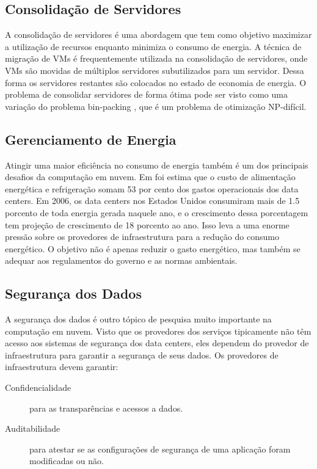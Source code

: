 	
	\subsection{Consolidação de Servidores}
	A consolidação de servidores é uma abordagem que tem como objetivo maximizar a utilização de recursos enquanto minimiza o consumo de energia. A técnica de migração de VMs é frequentemente utilizada na consolidação de servidores, onde VMs são movidas de múltiplos servidores subutilizados para um servidor. Dessa forma os servidores restantes são colocados no estado de economia de energia. O problema de consolidar servidores de forma ótima pode ser visto como uma variação do problema bin-packing \cite{Chekuri:1999}, que é um problema de otimização NP-difícil.
	
	\subsection{Gerenciamento de Energia}
	Atingir uma maior eficiência no consumo de energia também é um dos
        principais desafios da computação em nuvem. Em \cite{Hamilton} foi
        estima que o custo de alimentação energética e refrigeração somam 53
        por cento dos gastos operacionais dos data centers. Em 2006, os data
        centers nos Estados Unidos consumiram mais de 1.5 porcento de toda
        energia gerada naquele ano, e o crescimento dessa porcentagem tem
        projeção de crescimento de 18 porcento ao ano. Isso leva a uma enorme
        pressão sobre os provedores de infraestrutura para a redução do consumo energético. O objetivo não é apenas reduzir o gasto energético, mas também se adequar aos regulamentos do governo e as normas ambientais. 
	
	\subsection{Segurança dos Dados}
	A segurança dos dados é outro tópico de pesquisa muito importante na computação em nuvem. Visto que os provedores dos serviços tipicamente não têm acesso aos sistemas de segurança dos data centers, eles dependem do provedor de infraestrutura para garantir a segurança de seus dados. Os provedores de infraestrutura devem garantir:
	\begin{description}
		\item[Confidencialidade] para as transparências e acessos a
                    dados. 
		\item[Auditabilidade] para atestar se as configurações de segurança de uma aplicação foram modificadas ou não.  
	\end{description}	 
	
